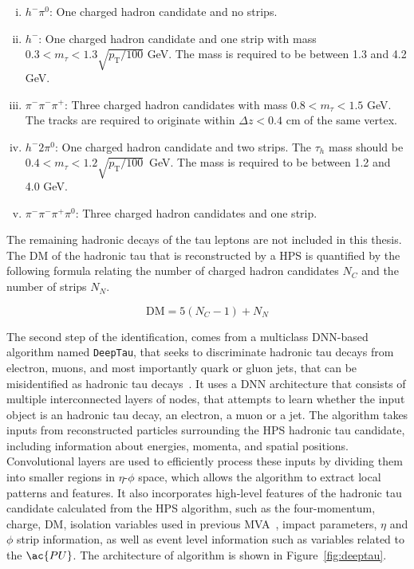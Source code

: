 \begin{enumerate}[i)]
\item $h^- \pi^0$: One charged hadron candidate and no strips.
\item $h^-$: One charged hadron candidate and one strip with mass $ 0.3 < m_{\tau} < 1.3 \sqrt{p_{\text{T}}/100}$ GeV. The mass is required to be between 1.3 and 4.2 GeV.
\item $\pi^- \pi^- \pi^+$: Three charged hadron candidates with mass $0.8 < m_{\tau} < 1.5$ GeV. The tracks are required to originate within $\Delta z<0.4$ cm of the same vertex.
\item $h^- 2\pi^0$: One charged hadron candidate and two strips. The $\tau_{h}$ mass should be $0.4 < m_{\tau} < 1.2\sqrt{p_{\text{T}}/100}$~GeV. The mass is required to be between 1.2 and 4.0 GeV.
\item $\pi^- \pi^- \pi^+ \pi^0$: Three charged hadron candidates and one strip.
\end{enumerate}

The remaining hadronic decays of the tau leptons are not included in this thesis.
The \ac{DM} of the hadronic tau that is reconstructed by a \ac{HPS} is quantified by the following formula relating the number of charged hadron candidates $N_C$ and the number of strips $N_N$.

\begin{equation}
\text{DM} = 5(N_{C} - 1) + N_{N}
\end{equation}

The second step of the identification, comes from a multiclass \ac{DNN}-based algorithm named \texttt{DeepTau}, that seeks to discriminate hadronic tau decays from electron, muons, and most importantly quark or gluon jets, that can be misidentified as hadronic tau decays~\cite{CMS:2022prd}.
It uses a \ac{DNN} architecture that consists of multiple interconnected layers of nodes, that attempts to learn whether the input object is an hadronic tau decay, an electron, a muon or a jet. 
The algorithm takes inputs from reconstructed particles surrounding the \ac{HPS} hadronic tau candidate, including information about energies, momenta, and spatial positions. 
Convolutional layers are used to efficiently process these inputs by dividing them into smaller regions in $\eta$-$\phi$ space, which allows the algorithm to extract local patterns and features. 
It also incorporates high-level features of the hadronic tau candidate calculated from the \ac{HPS} algorithm, such as the four-momentum, charge, \ac{DM}, isolation variables used in previous \ac{MVA}~\cite{CMS:2018jrd}, impact parameters, $\eta$ and $\phi$ strip information, as well as event level information such as variables related to the $\ac{PU}$.
The architecture of algorithm is shown in Figure~\ref{fig:deeptau}. \\

